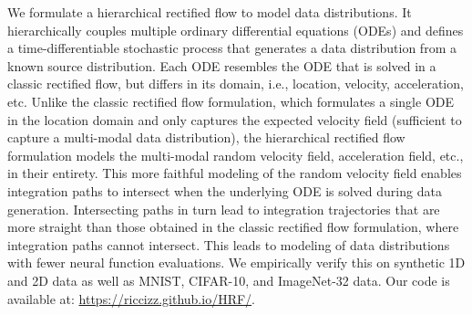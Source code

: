 We formulate a hierarchical rectified flow to model data distributions. It hierarchically couples multiple ordinary differential equations (ODEs) and defines a time-differentiable stochastic process that generates a data distribution from a known source distribution. Each ODE resembles the ODE that is solved in a classic rectified flow, but differs in its domain, i.e., location, velocity, acceleration, etc. 
Unlike the classic rectified flow formulation, which formulates a single ODE in the location domain and only captures the expected velocity field (sufficient to capture a multi-modal data distribution), the hierarchical rectified flow formulation models the multi-modal random velocity field, acceleration field, etc., in their entirety. This more faithful modeling of the random velocity field enables integration paths to intersect when the underlying ODE is solved during data generation. Intersecting paths in turn lead to integration trajectories that are more straight than those obtained in the classic rectified flow formulation, where integration paths cannot intersect. 
This leads to modeling of data distributions with fewer neural function evaluations. We empirically verify this on synthetic 1D and 2D data as well as MNIST, CIFAR-10, and ImageNet-32 data. Our code is available at: \url{https://riccizz.github.io/HRF/}. 
